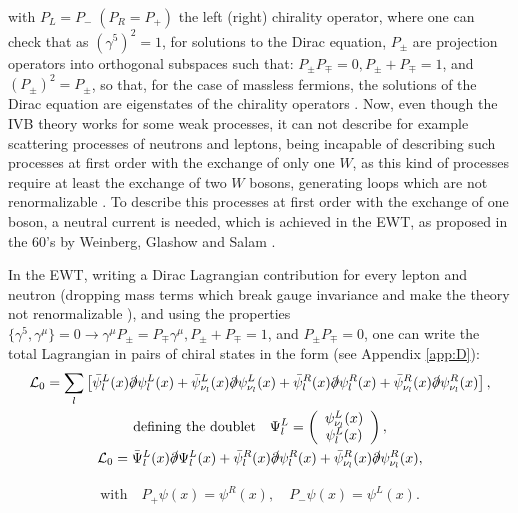 with $P_L = P_- \; (P_R = P_+)$ the left (right) chirality operator, where one can check that as $(\gamma^5)^2 = 1$, for solutions to the Dirac equation, $P_{\pm}$ are projection operators into orthogonal subspaces such that: $P_{\pm}P_{\mp} = 0, P_{\pm} + P_{\mp} = 1$, and $(P_{\pm})^2 = P_{\pm}$, so that, for the case of massless fermions, the solutions of the Dirac equation are eigenstates of the chirality operators \cite{Lahiri}. Now, even though the IVB theory works for some weak processes, it can not describe for example scattering processes of neutrons and leptons, being incapable of describing such processes at first order with the exchange of only one $W$, as this kind of processes require at least the exchange of two $W$ bosons, generating loops which are not renormalizable \cite{Mandl}. To describe this processes at first order with the exchange of one boson, a neutral current is needed, which is achieved in the EWT, as proposed in the 60's by Weinberg, Glashow and Salam \cite{Weinberg}.

In the EWT, writing a Dirac Lagrangian contribution for every lepton and neutron (dropping mass terms which break gauge invariance and make the theory not renormalizable \cite{Mandl}), and using the properties $\{\gamma^5,\gamma^{\mu}\}=0 \rightarrow \gamma^{\mu}P_{\pm}=P_{\mp}\gamma^{\mu}, P_{\pm}+P_{\mp} = 1$, and $P_{\pm}P_{\mp} = 0$, one can write the total Lagrangian in pairs of chiral states in the form (see Appendix \ref{app:D}):
\begin{gather}
    \mathcal{L}_0 = \sum_l \left[ \Bar{\psi}^L_l(x)\slashed{\partial}\psi^L_l(x) + \Bar{\psi}^L_{\nu_l}(x)\slashed{\partial}\psi^L_{\nu_l}(x) + \Bar{\psi}^R_l(x)\slashed{\partial}\psi^R_l(x) + \Bar{\psi}^R_{\nu_l}(x)\slashed{\partial}\psi^R_{\nu_l}(x) \right], \nonumber \\
    \textrm{defining the doublet} \quad \Psi_l^L = \left( \begin{array}{c}
    \psi^L_{\nu_l}(x) \\
    \psi^L_l(x)\end{array} \right), \nonumber \\
    \label{lagEWT}
    \mathcal{L}_0 = \Bar{\Psi}^L_l(x)\slashed{\partial}\Psi^L_l(x) + \Bar{\psi}^R_l(x)\slashed{\partial}\psi^R_l(x) + \Bar{\psi}^R_{\nu_l}(x)\slashed{\partial}\psi^R_{\nu_l}(x),
\end{gather}
    
\begin{gather*}
    \textrm{with} \quad P_+\psi(x) = \psi^R(x), \quad P_-\psi(x) = \psi^L(x).
\end{gather*}

